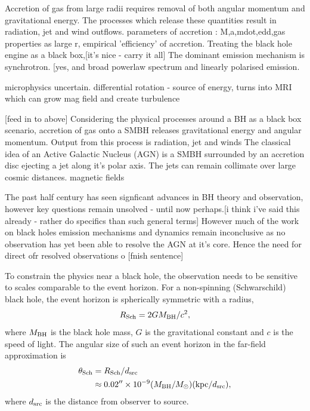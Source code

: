 Accretion of gas from large radii requires removal of both angular momentum and gravitational energy.\cite{Hawley_presentation} The processes which release these quantities result in radiation, jet and wind outflows. parameters of accretion : M,a,mdot,edd,gas properties as large r, empirical 'efficiency' of accretion. Treating the black hole engine as a black box,[it's nice - carry it all] 
The dominant emission mechanism is synchrotron.
[yes, and broad powerlaw spectrum and linearly polarised emission.

microphysics uncertain. differential rotation - source of energy, turns into MRI which can grow mag field and create turbulence

[feed in to above] Considering the physical processes around a BH as a black box scenario, accretion of gas onto a SMBH releases gravitational energy and angular momentum. Output from this process is radiation, jet and winds  The classical idea of an Active Galactic Nucleus (AGN) is a SMBH surrounded by an accretion disc ejecting a jet along it's polar axis. The jets can remain collimate over large cosmic distances. magnetic fields

 

The past half century has seen signficant advances in BH theory and observation, however key questions remain unsolved - until now perhaps.[i think i've said this already - rather do specifics than such general terms]
However much of the work on black holes emission mechanisms and dynamics remain inconclusive as no observation has yet been able to resolve the AGN at it's core. Hence the need for direct ofr resolved observations o [fnish sentence]



To constrain the physics near a black hole, the observation needs to be sensitive to scales comparable to the event horizon. For a non-spinning (Schwarschild) black hole, the event horizon is spherically symmetric with a radius, 
\begin{equation}
R_{\rm Sch} = 2 G M_{\rm BH} /c^2,
\end{equation}
where $M_{\rm BH}$ is the black hole mass, $G$ is the gravitational constant and $c$ is the speed of light. The angular size of such an event horizon in the far-field approximation is
\begin{align}
\theta_{\rm Sch} &= R_{\rm Sch} / d_{\rm src}\\
&\approx 0.02^{\prime \prime} \times 10^{-9} (M_{\rm BH}/M_\odot)({\rm kpc}/d_{\rm src}),
\end{align}
where $d_{\rm src}$ is the distance from observer to source.

